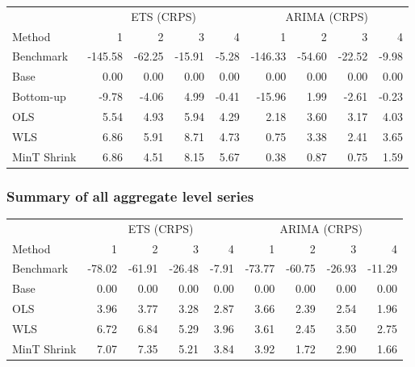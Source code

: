 \documentclass[]{article}
\begin{document}
\begin{table}[H]
\centering
\begin{tabular}{l|r|r|r|r|r|r|r|r}
\hline
\multicolumn{1}{c|}{ } & \multicolumn{4}{|c|}{ETS (CRPS)} & \multicolumn{4}{|c}{ARIMA (CRPS)} \\
\cline{2-5} \cline{6-9}
Method & 1 & 2 & 3 & 4 & 1 & 2 & 3 & 4\\
\hline
Benchmark & -145.58 & -62.25 & -15.91 & -5.28 & -146.33 & -54.60 & -22.52 & -9.98\\
\hline
Base & 0.00 & 0.00 & 0.00 & 0.00 & 0.00 & 0.00 & 0.00 & 0.00\\
\hline
Bottom-up & -9.78 & -4.06 & 4.99 & -0.41 & -15.96 & 1.99 & -2.61 & -0.23\\
\hline
OLS & 5.54 & 4.93 & 5.94 & 4.29 & 2.18 & 3.60 & 3.17 & 4.03\\
\hline
WLS & 6.86 & 5.91 & 8.71 & 4.73 & 0.75 & 3.38 & 2.41 & 3.65\\
\hline
MinT Shrink & 6.86 & 4.51 & 8.15 & 5.67 & 0.38 & 0.87 & 0.75 & 1.59\\
\hline
\end{tabular}
\end{table}

\subsubsection{Summary of all aggregate level
series}\label{summary-of-all-aggregate-level-series-1}

\begin{table}[H]
\centering
\begin{tabular}{l|r|r|r|r|r|r|r|r}
\hline
\multicolumn{1}{c|}{ } & \multicolumn{4}{|c|}{ETS (CRPS)} & \multicolumn{4}{|c}{ARIMA (CRPS)} \\
\cline{2-5} \cline{6-9}
Method & 1 & 2 & 3 & 4 & 1 & 2 & 3 & 4\\
\hline
Benchmark & -78.02 & -61.91 & -26.48 & -7.91 & -73.77 & -60.75 & -26.93 & -11.29\\
\hline
Base & 0.00 & 0.00 & 0.00 & 0.00 & 0.00 & 0.00 & 0.00 & 0.00\\
\hline
OLS & 3.96 & 3.77 & 3.28 & 2.87 & 3.66 & 2.39 & 2.54 & 1.96\\
\hline
WLS & 6.72 & 6.84 & 5.29 & 3.96 & 3.61 & 2.45 & 3.50 & 2.75\\
\hline
MinT Shrink & 7.07 & 7.35 & 5.21 & 3.84 & 3.92 & 1.72 & 2.90 & 1.66\\
\hline
\end{tabular}
\end{table}
\end{document}
